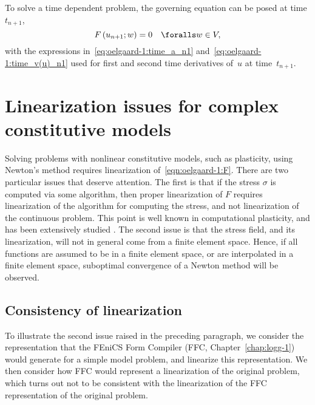 To solve a time dependent problem, the governing equation can be posed
at time $t_{n+1}$,
%
\begin{equation}
  F\left( u_{n+1}; w \right) = 0 \quad \foralls w \in V,
\end{equation}
%
with the expressions in~\eqref{eq:oelgaard-1:time_a_n1}
and~\eqref{eq:oelgaard-1:time_v(u)_n1} used for first and second time
derivatives of~$u$ at time~$t_{n+1}$.

\section{Linearization issues for complex constitutive models}
\label{sec:oelgaard-1:linearization}

Solving problems with nonlinear constitutive models, such
as plasticity, using Newton's method requires linearization
of~\eqref{eqn:oelgaard-1:F}. There are two particular issues that deserve
attention. The first is that if the stress $\sigma$ is computed via
some algorithm, then proper linearization of $F$ requires linearization
of the algorithm for computing the stress, and not linearization of the
continuous problem. This point is well known in computational plasticity,
and has been extensively studied \citep{SimoTaylor1985}. The second issue
is that the stress field, and its linearization, will not in general
come from a finite element space.  Hence, if all functions are assumed
to be in a finite element space, or are interpolated in a finite element
space, suboptimal convergence of a Newton method will be observed.

\subsection{Consistency of linearization}

To illustrate the second issue raised in the preceding paragraph, we
consider the representation that the FEniCS Form Compiler (FFC,
Chapter~\ref{chap:logg-1}) would generate for a simple model
problem, and linearize this representation. We then consider how FFC
would represent a linearization of the original problem, which turns out
not to be consistent with the linearization of the FFC representation
of the original problem.

